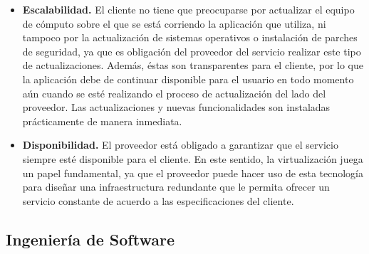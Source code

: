\begin{itemize}
	\item \textbf{Escalabilidad.} El cliente no tiene que preocuparse por actualizar el equipo de cómputo sobre el que se está corriendo la aplicación que utiliza, ni tampoco por la actualización de sistemas operativos o instalación de parches de seguridad, ya que es obligación del proveedor del servicio realizar este tipo de actualizaciones. Además, éstas son transparentes para el cliente, por lo que la aplicación debe de continuar disponible para el usuario en todo momento aún cuando se esté realizando el proceso de actualización del lado del proveedor. Las actualizaciones y nuevas funcionalidades son instaladas prácticamente de manera inmediata.
	
	\item \textbf{Disponibilidad.} El proveedor está obligado a garantizar que el servicio siempre esté disponible para el cliente. En este sentido, la virtualización juega un papel fundamental, ya que el proveedor puede hacer uso de esta tecnología para diseñar una infraestructura redundante que le permita ofrecer un servicio constante de acuerdo a las especificaciones del cliente.
	
\end{itemize}

\subsection{Ingeniería de Software}














